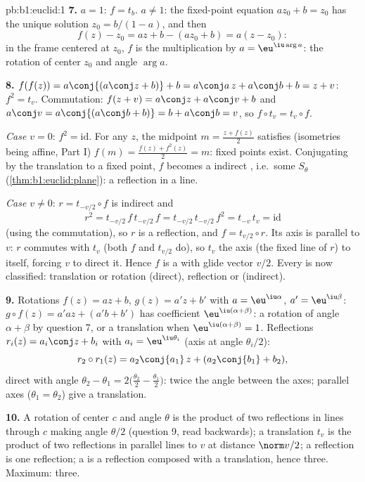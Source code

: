 \begin{solution}{pb:b1:euclid:1}
\textbf{7.} $a = 1$: $f = t_b$. $a \neq 1$: the fixed-point
equation $az_0 + b = z_0$ has the unique solution $z_0 = b/(1 -
a)$, and then
\[
f(z) - z_0 = az + b - (az_0 + b) = a(z - z_0):
\]
in the frame centered at $z_0$, $f$ is the multiplication by $a
= \eu^{\iu\arg a}$: the rotation of center $z_0$ and angle
$\arg a$.

\textbf{8.} $f(f(z)) = a\conj{(a\conj z + b)} + b = a\conj a\,z
+ a\conj b + b = z + v$: $f^2 = t_v$. Commutation: $f(z + v) =
a\conj z + a\conj v + b$ and $a\conj v = a\conj{(a\conj b + b)}
= b + a\conj b = v$, so $f\circ t_v = t_v\circ f$.

\emph{Case $v = 0$}: $f^2 = \mathrm{id}$. For any $z$, the
midpoint $m = \frac{z + f(z)}2$ satisfies (isometries being
affine, Part I) $f(m) = \frac{f(z) + f^2(z)}{2} = m$: fixed
points exist. Conjugating by the translation to a fixed point,
$f$ becomes a  indirect , i.e.\ some $S_\theta$
(\cref{thm:b1:euclid:plane}): a reflection in a line.

\emph{Case $v \neq 0$}: $r = t_{-v/2}\circ f$ is indirect and
\[
r^2 = t_{-v/2}\,f\,t_{-v/2}\,f = t_{-v/2}\,t_{-v/2}\,f^2
= t_{-v}\,t_v = \mathrm{id}
\]
(using the commutation), so $r$ is a reflection, and $f =
t_{v/2}\circ r$. Its axis is parallel to $v$: $r$ commutes with
$t_v$ (both $f$ and $t_{v/2}$ do), so $t_v$  the axis (the
fixed line of $r$) to itself, forcing $v$ to direct it. Hence
$f$ is a  with glide vector $v/2$. Every
 is now classified: translation or rotation (direct),
reflection or  (indirect).

\textbf{9.} Rotations $f(z) = az + b$, $g(z) = a'z + b'$ with
$a = \eu^{\iu\alpha}$, $a' = \eu^{\iu\beta}$: $g\circ f(z) =
a'az + (a'b + b')$ has  coefficient
$\eu^{\iu(\alpha+\beta)}$: a rotation of angle $\alpha + \beta$
by question 7, or a translation when $\eu^{\iu(\alpha+\beta)} =
1$. Reflections $r_i(z) = a_i\conj z + b_i$ with $a_i =
\eu^{\iu\theta_i}$ (axis at angle $\theta_i/2$):
\[
r_2\circ r_1(z) = a_2\conj{a_1}\,z + (a_2\conj{b_1} + b_2),
\]
direct with angle $\theta_2 - \theta_1 = 2\bigl(\tfrac{\theta_2}2
- \tfrac{\theta_1}2\bigr)$: twice the angle between the axes;
parallel axes ($\theta_1 = \theta_2$) give a translation.

\textbf{10.} A rotation of center $c$ and angle $\theta$ is the
product of two reflections in lines through $c$ making angle
$\theta/2$ (question 9, read backwards); a translation $t_v$ is
the product of two reflections in parallel lines  to
$v$ at distance $\norm v/2$; a reflection is one reflection; a
 is a reflection composed with a translation,
hence three. Maximum: three.


\end{solution}
